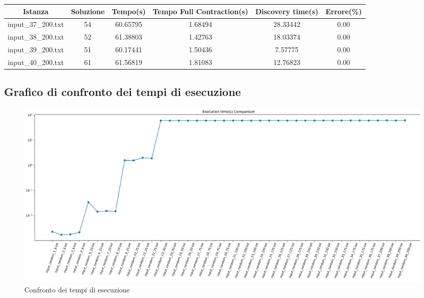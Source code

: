 \begin{center}
	\begin{tabular}{|c|c|c|c|c|c|}
		\hline
		\parbox{2cm}{\centering Istanza} & {Soluzione} & {Tempo(s)} & \parbox{2.75cm}{\vspace{.1cm}\centering Tempo Full Contraction(s)\vspace{.1cm}} & \parbox{2cm}{\centering Discovery time(s)} & {Errore(\%)}\\\hline
		input\_37\_200.txt & 54 & 60.65795 & 1.68494 & 28.33442 & 0.00\\\hline
		input\_38\_200.txt & 52 & 61.38803 & 1.42763 & 18.03374 & 0.00\\\hline
		input\_39\_200.txt & 51 & 60.17441 & 1.50436 & 7.57775 & 0.00\\\hline
		input\_40\_200.txt & 61 & 61.56819 & 1.81083 & 12.76823 & 0.00\\\hline
	\end{tabular}
\end{center}

\subsection{Grafico di confronto dei tempi di esecuzione}
\begin{center}
	\begin{figure}[H]
		\centering
		\hspace{-1cm}\includegraphics[width=\linewidth]{Img/exec_time_graph.jpg}
		\caption{Confronto dei tempi di esecuzione}
	\end{figure}
\end{center}

